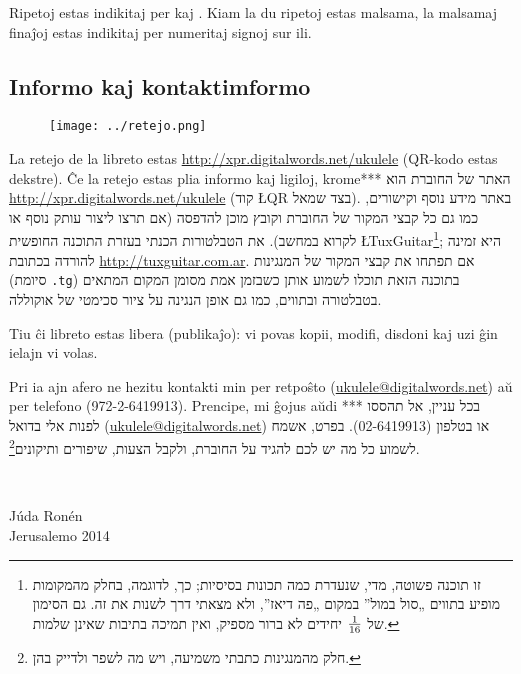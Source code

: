 Ripetoj estas indikitaj per  kaj . Kiam la du ripetoj estas malsama, la malsamaj finaĵoj estas indikitaj per numeritaj  signoj sur ili.



\subsection*{Informo kaj kontaktimformo}

\begin{wrapfigure}[4]{r}{1.75cm}\vspace{-\baselineskip}\texttt{[image: ../retejo.png]}\end{wrapfigure}
	La retejo de la libreto estas \url{http://xpr.digitalwords.net/ukulele} (QR-kodo estas dekstre). Ĉe la retejo estas plia informo kaj ligiloj, krome***
האתר של החוברת הוא \url{http://xpr.digitalwords.net/ukulele} (קוד \L{QR} בצד שמאל). באתר מידע נוסף וקישורים, כמו גם כל קבצי המקור של החוברת וקובץ מוכן להדפסה (אם תרצו ליצור עותק נוסף או לקרוא במחשב). את הטבלטורות הכנתי בעזרת התוכנה החופשית \L{TuxGuitar}\footnote{זו תוכנה פשוטה, מדי, שנעדרת כמה תכונות בסיסיות; כך, לדוגמה, בחלק מהמקומות מופיע בתווים „סול במול” במקום „פה דיאז”, ולא מצאתי דרך לשנות את זה. גם הסימון של ${1}\over{16}$ יחידים לא ברור מספיק, ואין תמיכה בתיבות שאינן שלמות.}; היא זמינה להורדה בכתובת \url{http://tuxguitar.com.ar}. אם תפתחו את קבצי המקור של המנגינות (סיומת \texttt{.tg}) בתוכנה הזאת תוכלו לשמוע אותן כשבזמן אמת מסומן המקום המתאים בטבלטורה ובתווים, כמו גם אופן הנגינה על ציור סכימטי של אוקוללה.

Tiu ĉi libreto estas libera (publikaĵo): vi povas kopii, modifi, disdoni kaj uzi ĝin ielajn vi volas.

Pri ia ajn afero ne hezitu kontakti min per retpoŝto (\url{ukulele@digitalwords.net}) aŭ per telefono (972-2-6419913). Prencipe, mi ĝojus aŭdi ***
בכל עניין, אל תהססו לפנות אלי בדואל (\url{ukulele@digitalwords.net}) או בטלפון (02-6419913). בפרט, אשמח לשמוע כל מה יש לכם להגיד על החוברת, ולקבל הצעות, שיפורים ותיקונים\footnote{חלק מהמנגינות כתבתי משמיעה, ויש מה לשפר ולדייק בהן.}.

\vspace{\baselineskip}
~\hfill
\begin{minipage}{3cm}
	Júda Ronén\\
	Jerusalemo 2014\\
\end{minipage}
